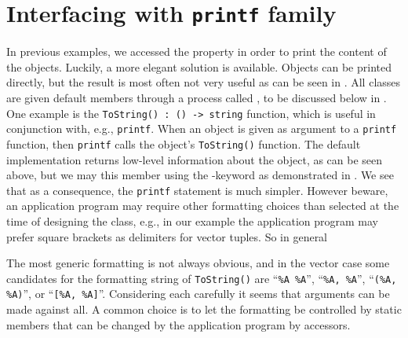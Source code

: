 \section{Interfacing with \lstinline{printf} family}
In previous examples, we accessed the property in order to print the content of the objects. Luckily, a more elegant solution is available. Objects can be printed directly, but the result is most often not very useful as can be seen in .
%
%
All classes are given default members through a process called , to be discussed below in . One example is the \lstinline{ToString() : () -> string} function, which is useful in conjunction with, e.g., \lstinline{printf}. When an object is given as argument to a \lstinline{printf} function, then \lstinline{printf} calls the object's \lstinline{ToString()} function. The default implementation returns low-level information about the object, as can be seen above, but we may 
 this member using the -keyword as demonstrated in .
%
%
We see that as a consequence, the \lstinline{printf} statement is much simpler. However beware, an application program may require other formatting choices than selected at the time of designing the class, e.g., in our example the application program may prefer square brackets as delimiters for vector tuples.  So in general  

The most generic formatting is not always obvious, and in the vector case some candidates for the formatting string of \lstinline{ToString()} are ``\lstinline{%A %A}'', ``\lstinline{%A, %A}'', ``\lstinline{(%A, %A)}'', or ``\lstinline{[%A, %A]}''.
 Considering each carefully it seems that arguments can be made against all. A common choice is to let the formatting be controlled by static members that can be changed by the application program by accessors.



